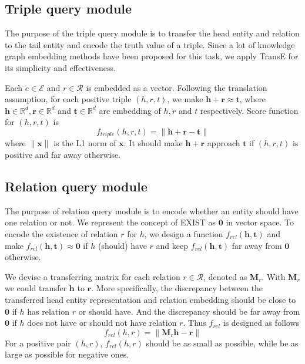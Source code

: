 \subsection{Triple query module}
The purpose of the triple query module is to transfer the head entity and  relation to the tail entity and encode the truth value of a triple. Since a lot of knowledge graph embedding methods have been proposed for this task, we apply TransE \cite{TransE-Bordes-2013} for its simplicity and effectiveness. 

Each $e \in \mathcal{E}$ and $r \in \mathcal{R}$ is embedded as a vector.  Following the translation assumption, for each positive triple $(h, r, t)$, we make $\mathbf{h} + \mathbf{r} \approx \mathbf{t}$, where $\mathbf{h}\in \mathbb{R}^d, \mathbf{r}\in \mathbb{R}^d$  and $\mathbf{t}\in \mathbb{R}^d$ are embedding of $h, r$ and $t$ respectively. Score function for $(h, r, t)$ is 
\begin{equation}
f_{triple}(h,r,t) = \|\mathbf{h} + \mathbf{r} - \mathbf{t}\|  
\label{score-triple}
\end{equation}
where $\| \mathbf{x} \|$ is the L1 norm of  $\mathbf{x}$. It should make $\mathbf{h} + \mathbf{r}$ approach $\mathbf{t}$ if $(h,r,t)$ is  positive and  far away otherwise. 


\subsection{Relation query module}
The purpose of relation query module is to encode whether an entity should have one relation or not. We represent the concept of  EXIST as $\mathbf{0}$ in vector space.  To encode the existence of relation $r$ for $h$, we design a function $f_{rel}(\mathbf{h}, \mathbf{t})$ and make $f_{rel}(\mathbf{h}, \mathbf{t}) \approx \mathbf{0}$ if $h$ (should) have  $r$ and keep $f_{rel}(\mathbf{h}, \mathbf{t})$ far away from $\mathbf{0}$ otherwise. 

We devise a transferring matrix for each relation $r \in \mathcal{R}$, denoted as $\mathbf{M}_r$. With $\mathbf{M}_r$ we could transfer $\mathbf{h}$ to $\mathbf{r}$. More specifically, the discrepancy between the transferred head entity representation and relation embedding should be close to $\mathbf{0}$ if $h$ has relation $r$ or should have. And the discrepancy should be far away from $\mathbf{0}$ if $h$ does not have or should not have relation $r$. Thus $f_{rel}$ is designed as follows
\begin{equation}
f_{rel}(h, r) = \| \mathbf{M}_r \mathbf{h} - \mathbf{r}\|
\label{score-rel}
\end{equation}
For a positive pair $(h,r)$, $f_{rel}(h,r)$ should be as small as possible, while be as large as possible for negative ones. 

